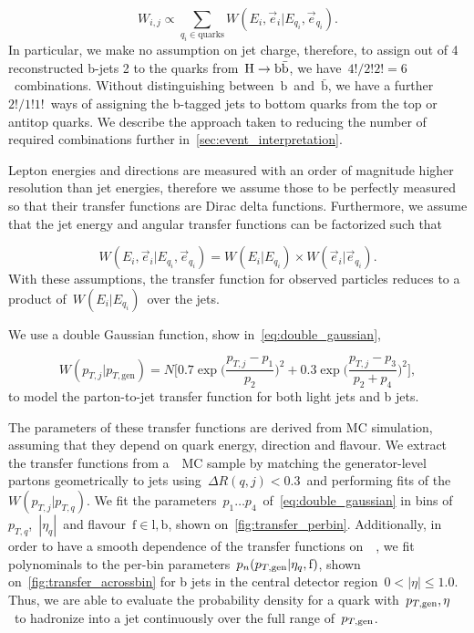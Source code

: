 \begin{equation}
\label{eq:tf_combination_sum}
W_{i,j} \propto \sum_{q_i \in \mathrm{quarks}} W(E_i, \vec{e}_i | E_{q_i}, \vec{e}_{q_i}).
\end{equation}
In particular, we make no assumption on jet charge, therefore, to assign out of 4 reconstructed b-jets 2 to the quarks from~$\mathrm{H} \rightarrow \mathrm{b}\bar{\mathrm{b}}$, we have~$4!/2!2! = 6$~combinations. Without distinguishing between~$\mathrm{b}$~and~$\bar{\mathrm{b}}$, we have a further~$2!/1!1!$~ways of assigning the b-tagged jets to bottom quarks from the top or antitop quarks. We describe the approach taken to reducing the number of required combinations further in~\cref{sec:event_interpretation}.

Lepton energies and directions are measured with an order of magnitude higher resolution than jet energies, therefore we assume those to be perfectly measured so that their transfer functions are Dirac delta functions.
Furthermore, we assume that the jet energy and angular transfer functions can be factorized such that

\begin{equation}
W(E_i, \vec{e}_i | E_{q_i}, \vec{e}_{q_i}) = W(E_i | E_{q_i}) \times W(\vec{e}_i | \vec{e}_{q_i}).
\end{equation}
With these assumptions, the transfer function for observed particles reduces to a product of~$W(E_i | E_{q_i})$~over the jets.

We use a double Gaussian function, show in~\cref{eq:double_gaussian},

\begin{equation}
\label{eq:double_gaussian}
W(p_{T,j} | p_{T,\mathrm{gen}}) = N \biggl[0.7\exp{\biggl(\frac{p_{T,j} - p_1}{p_2}\biggr)^2} + 0.3\exp{\biggl(\frac{p_{T,j} - p_3}{p_2+p_4}\biggr)^2}\biggr],
\end{equation}
to model the parton-to-jet transfer function for both light jets and b jets.

The parameters of these transfer functions are derived from MC simulation, assuming that they depend on quark energy, direction and flavour. We extract the transfer functions from a~\ttbar~MC sample by matching the generator-level partons geometrically to jets using~$\Delta R(q,j) < 0.3$~and performing fits of the~$W(p_{T,j}|p_{T,q})$. We fit the parameters~$p_1 \dots p_4$~of~\cref{eq:double_gaussian} in bins of~$p_{T,q}$,~$|\eta_{q}|$~and flavour~$\mathrm{f}\in{\mathrm{l}, \mathrm{b}}$, shown on~\cref{fig:transfer_perbin}. Additionally, in order to have a smooth dependence of the transfer functions on~\ptgen~, we fit polynominals to the per-bin parameters~$p_n(p_{T,\mathrm{gen}}|\eta_{q},\mathrm{f})$, shown on~\cref{fig:transfer_acrossbin} for b jets in the central detector region~$0 < |\eta| \le 1.0$. Thus, we are able to evaluate the probability density for a quark with~$p_{T,\mathrm{gen}},\eta$~to hadronize into a jet continuously over the full range of~$p_{T,\mathrm{gen}}$.

